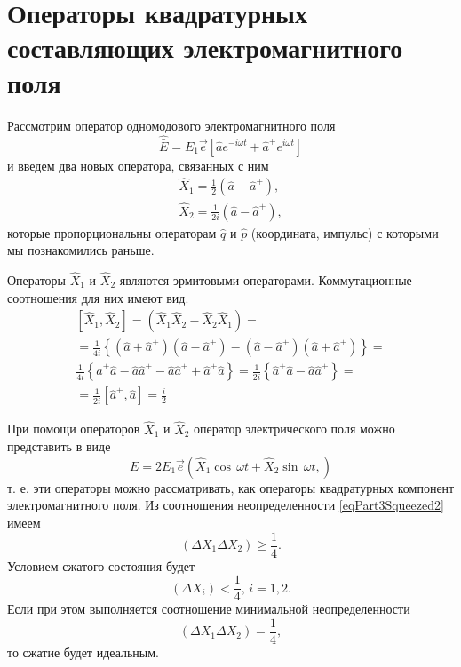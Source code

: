 \section{Операторы квадратурных составляющих электромагнитного
  поля}
Рассмотрим оператор одномодового электромагнитного поля 
\begin{equation}
\hat{\bar{E}} = 
E_1 \vec{e}\left[
\hat{a} e^{-i\omega t} +
\hat{a}^{+} e^{i\omega t}
\right]
\nonumber
\end{equation}
и введем два новых оператора, связанных с ним
\begin{eqnarray}
\hat{X}_1 = \frac{1}{2}\left(\hat{a} + \hat{a}^{+}\right),
\nonumber \\
\hat{X}_2 = \frac{1}{2i}\left(\hat{a} - \hat{a}^{+}\right),
\nonumber
\end{eqnarray}
которые пропорциональны операторам $\hat{q}$ и $\hat{p}$ (координата,
импульс) с которыми мы познакомились раньше.

Операторы $\hat{X}_1$ и $\hat{X}_2$ являются эрмитовыми
операторами. Коммутационные соотношения для них имеют вид.
\begin{eqnarray}
\left[\hat{X}_1, \hat{X}_2\right] = 
\left(\hat{X}_1 \hat{X}_2 - \hat{X}_2 \hat{X}_1 \right) = 
\nonumber \\
=
\frac{1}{4i}
\left\{
\left(\hat{a} + \hat{a}^{+}\right)
\left(\hat{a} - \hat{a}^{+}\right)
-
\left(\hat{a} - \hat{a}^{+}\right)
\left(\hat{a} + \hat{a}^{+}\right)
\right\} = 
\nonumber \\
\frac{1}{4i}
\left\{
\hat{a}^{+}\hat{a}
- \hat{a}\hat{a}^{+}
- \hat{a}\hat{a}^{+}
+
\hat{a}^{+}\hat{a}
\right\} = 
\frac{1}{2i}
\left\{
\hat{a}^{+}\hat{a}
- \hat{a}\hat{a}^{+}
\right\} =
\nonumber \\
= 
\frac{1}{2i}
\left[\hat{a}^{+}, \hat{a}\right] = 
\frac{i}{2}
\nonumber
\end{eqnarray}

При помощи операторов $\hat{X}_1$ и $\hat{X}_2$ оператор
электрического поля можно представить в виде
\begin{equation}
E = 2 E_1 \vec{e}\left(
\hat{X}_1 \cos \, \omega t +
\hat{X}_2 \sin \, \omega t,
\right)
\nonumber
\end{equation}
т. е. эти операторы можно рассматривать, как операторы квадратурных
компонент электромагнитного поля. Из соотношения неопределенности
\eqref{eqPart3Squeezed2} имеем
\begin{equation}
\left(
\Delta X_1 \Delta X_2
\right) \ge \frac{1}{4}.
\nonumber
\end{equation}
Условием сжатого состояния будет
\begin{equation}
\left(
\Delta X_i 
\right) < \frac{1}{4}, \, i = 1,2.
\nonumber
\end{equation}
Если при этом выполняется соотношение минимальной неопределенности
\begin{equation}
\left(
\Delta X_1 \Delta X_2
\right) = \frac{1}{4},
\nonumber
\end{equation}
то сжатие будет идеальным.

